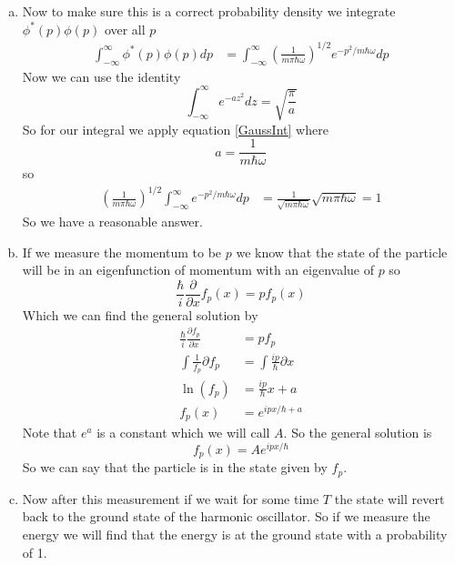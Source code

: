 \documentclass[11pt]{article}
\numberwithin{equation}{section}
\begin{document}
\begin{enumerate}[(a)]
\item
Now to make sure this is a correct probability density we integrate $\phi^*(p)\phi(p)$ over all $p$ 
\begin{align*}
\int_{-\infty}^{\infty}\phi^*(p)\phi(p)dp &= \int_{-\infty}^{\infty}\left(\frac{1}{m\pi\hbar\omega}\right)^{1/2}e^{-p^2/{m\hbar\omega}}dp
\end{align*}
Now we can use the identity 
\begin{equation}
\int_{-\infty}^{\infty}e^{-az^2}dz = \sqrt{\frac{\pi}{a}}
\label{GaussInt}
\end{equation}
So for our integral we apply equation \ref{GaussInt} where
$$a = \frac{1}{m\hbar\omega}$$
so
\begin{align*}
\left(\frac{1}{m\pi\hbar\omega}\right)^{1/2}\int_{-\infty}^{\infty}e^{-p^2/{m\hbar\omega}}dp &= \frac{1}{\sqrt{m\pi\hbar\omega}}\sqrt{m\pi\hbar\omega} = 1
\end{align*}
So we have a reasonable answer.

\item
If we measure the momentum to be $p$ we know that the state of the particle will be in an eigenfunction of momentum with an eigenvalue of $p$ so
$$\frac{\hbar}{i}\frac{\partial}{\partial x}f_p(x) = pf_p(x)$$
Which we can find the general solution by
\begin{align*}
\frac{\hbar}{i}\frac{\partial f_p}{\partial x} &= pf_p\\
\int\frac{1}{f_p}{\partial f_p} &= \int\frac{ip}{\hbar}{\partial x}\\
\ln(f_p) &= \frac{ip}{\hbar}x+a\\
f_p(x) &= e^{ipx/\hbar+a}
\end{align*}
Note that $e^{a}$ is a constant which we will call $A$. So the general solution is
$$f_p(x) = Ae^{ipx/\hbar}$$
So we can say that the particle is in the state given by $f_p$.

\item
Now after this measurement if we wait for some time $T$ the state will revert back to the ground state of the harmonic oscillator. So if we measure the energy we will find that the energy is at the ground state with a probability of 1.
\end{enumerate}
\end{document}
